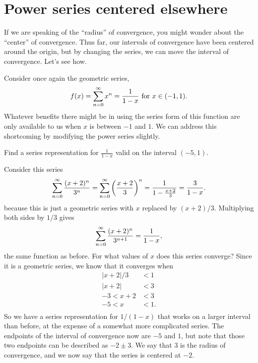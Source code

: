 \section{Power series centered elsewhere}
\label{section:power-series-centered-around-a}

If we are speaking of the ``radius'' of convergence, you might wonder
about the ``center'' of convergence.  Thus far, our intervals of
convergence have been centered around the origin, but by changing the
series, we can move the interval of convergence.  Let's see how.

Consider once again the geometric series,
$$
f(x) = \sum_{n=0}^\infty x^n={1\over 1-x} \mbox{ for $x \in (-1,1)$.}
$$
Whatever benefits there might be in using the series form of this
function are only available to us when $x$ is between $-1$ and
$1$.  We can address this shortcoming by modifying the power
series slightly.

\begin{example}
\label{example:one-over-one-minus-x-on-different-interval}
Find a series representation for $\frac{1}{1-x}$ valid on the interval $(-5,1)$.
\end{example}

\begin{solution}
Consider this series
$$
  \sum_{n=0}^\infty {(x+2)^n\over 3^n}=
  \sum_{n=0}^\infty \left({x+2\over 3}\right)^n={1\over 1-{x+2\over 3}}=
  {3\over 1-x}.
$$
because this is just a geometric series with $x$ replaced by
$(x+2)/3$. Multiplying both sides by $1/3$ 
gives
$$\sum_{n=0}^\infty {(x+2)^n\over 3^{n+1}}={1\over 1-x},$$
the same function as before. For what values of $x$ does this series
converge? Since it is a geometric series, we know that it converges
when 
\begin{align*}
  |x+2|/3&<1 \\
  |x+2|&<3 \\
  -3 < x+2 &< 3 \\
  -5<x&<1. \\
\end{align*}
So we have a series representation for $1/(1-x)$ that works on a
larger interval than before, at the expense of a somewhat more
complicated series. The endpoints of the interval of convergence now
are $-5$ and $1$, but note that those two endpoints can be described
as $-2\pm3$. We say that $3$ is the radius of convergence, and we now
say that the series is centered at $-2$.
\end{solution}

